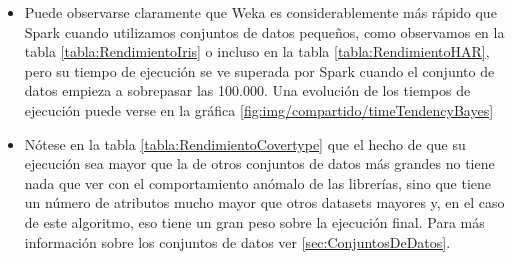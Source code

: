 \begin{itemize}
	\item Puede observarse claramente que Weka es considerablemente más rápido que Spark cuando utilizamos conjuntos de datos pequeños, como observamos en la tabla \ref{tabla:RendimientoIris} o incluso en la tabla \ref{tabla:RendimientoHAR}, pero su tiempo de ejecución se ve superada por Spark cuando el conjunto de datos empieza a sobrepasar las 100.000. Una evolución de los tiempos de ejecución puede verse en la gráfica \ref{fig:img/compartido/timeTendencyBayes}

	\item Nótese en la tabla \ref{tabla:RendimientoCovertype} que el hecho de que su ejecución sea mayor que la de otros conjuntos de datos más grandes no tiene nada que ver con el comportamiento anómalo de las librerías, sino que tiene un número de atributos mucho mayor que otros datasets mayores y, en el caso de este algoritmo, eso tiene un gran peso sobre la ejecución final. Para más información sobre los conjuntos de datos ver \ref{sec:ConjuntosDeDatos}.
	

\end{itemize}
